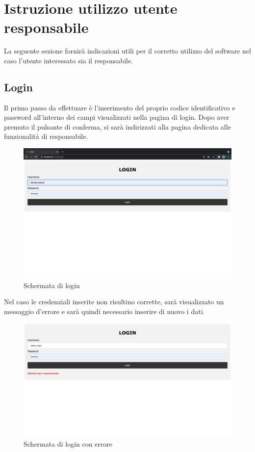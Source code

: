 \section{Istruzione utilizzo utente responsabile}

La seguente sezione fornirà indicazioni utili per il corretto utilizzo del software nel caso l'utente interessato sia il responsabile.

\subsection{Login}
Il primo passo da effettuare è l'inserimento del proprio codice identificativo e password all'interno dei campi visualizzati nella pagina di login. Dopo aver premuto il pulsante di conferma, si sarà indirizzati alla pagina dedicata alle funzionalità di responsabile. 
\begin{figure}[H]
    \centering
    \includegraphics[scale=0.12]{res/images/login.png}
    \caption{Schermata di login}
\end{figure}
Nel caso le credenziali inserite non risultino corrette, sarà visualizzato un messaggio d'errore e sarà quindi necessario inserire di nuovo i dati.
\begin{figure}[H]
    \centering
    \includegraphics[scale=0.2]{res/images/login_errato.png}
    \caption{Schermata di login con errore}
\end{figure}


